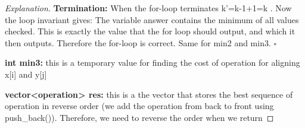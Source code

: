 \documentclass[openany]{article}
\begin{document}
\begin{proof}[Explanation]{}
        \qquad \textbf{Termination:} When the for-loop terminates  k'=k-1+1=k . Now the loop invariant gives: The variable answer contains the minimum of all values checked. This is exactly the value that the for loop should output, and which it then outputs. Therefore the for-loop is correct. Same for min2 and min3. $\square$

        \textbf{int min3:} this is a temporary value for finding the cost of operation for aligning x[i] and y[j]
        
        \textbf{vector<operation> res:} this is a the vector that stores the best sequence of operation in reverse order (we add the operation from back to front using push\_back()). Therefore, we need to reverse the order when we return
       
\end{proof}
\end{document}
